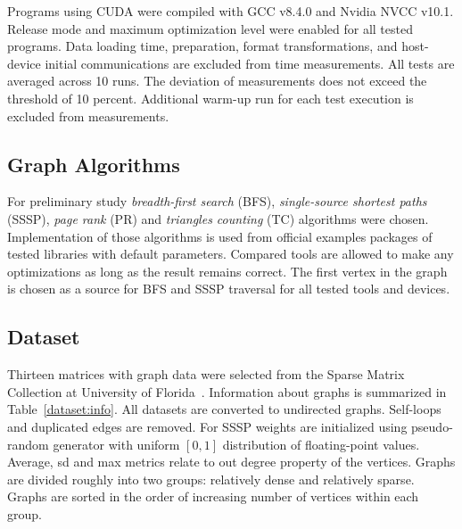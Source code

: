 Programs using CUDA were compiled with GCC v8.4.0 and Nvidia NVCC v10.1.
Release mode and maximum optimization level were enabled for all tested programs. 
Data loading time, preparation, format transformations, and host-device initial communications are excluded from time measurements. 
All tests are averaged across 10 runs. The deviation of measurements does not exceed the threshold of 10 percent. Additional warm-up run for each test execution is excluded from measurements.

\subsection{Graph Algorithms}

For preliminary study \textit{breadth-first search} (BFS), \textit{single-source shortest paths} (SSSP), \textit{page rank} (PR) and \textit{triangles counting} (TC) algorithms were chosen.
Implementation of those algorithms is used from official examples packages of tested libraries with default parameters. Compared tools are allowed to make any optimizations as long as the result remains correct.
The first vertex in the graph is chosen as a source for BFS and SSSP traversal for all tested tools and devices.

\subsection{Dataset}

Thirteen matrices with graph data were selected from the Sparse Matrix Collection at University of Florida~\cite{dataset:10.1145/2049662.2049663}. 
Information about graphs is summarized in Table~\ref{dataset:info}. 
All datasets are converted to undirected graphs. 
Self-loops and duplicated edges are removed. For SSSP weights are initialized using pseudo-random generator with uniform $[0, 1]$ distribution of floating-point values.
Average, sd and max metrics relate to out degree property of the vertices. 
Graphs are divided roughly into two groups: relatively dense and relatively sparse.
Graphs are sorted in the order of increasing number of vertices within each group.


